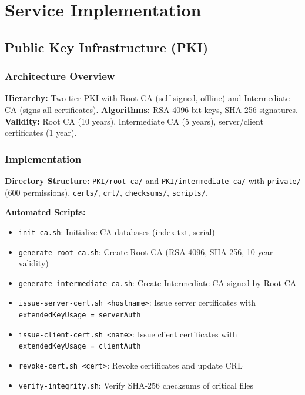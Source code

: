 

\chapter{Service Implementation}

\section{Public Key Infrastructure (PKI)}

\subsection{Architecture Overview}

\textbf{Hierarchy:} Two-tier PKI with Root CA (self-signed, offline) and Intermediate CA (signs all certificates). \textbf{Algorithms:} RSA 4096-bit keys, SHA-256 signatures. \textbf{Validity:} Root CA (10 years), Intermediate CA (5 years), server/client certificates (1 year).

\subsection{Implementation}

\textbf{Directory Structure:} \texttt{PKI/root-ca/} and \texttt{PKI/intermediate-ca/} with \texttt{private/} (600 permissions), \texttt{certs/}, \texttt{crl/}, \texttt{checksums/}, \texttt{scripts/}.

\textbf{Automated Scripts:}
\begin{itemize}
    \item \texttt{init-ca.sh}: Initialize CA databases (index.txt, serial)
    \item \texttt{generate-root-ca.sh}: Create Root CA (RSA 4096, SHA-256, 10-year validity)
    \item \texttt{generate-intermediate-ca.sh}: Create Intermediate CA signed by Root CA
    \item \texttt{issue-server-cert.sh <hostname>}: Issue server certificates with \texttt{extendedKeyUsage = serverAuth}
    \item \texttt{issue-client-cert.sh <name>}: Issue client certificates with \texttt{extendedKeyUsage = clientAuth}
    \item \texttt{revoke-cert.sh <cert>}: Revoke certificates and update CRL
    \item \texttt{verify-integrity.sh}: Verify SHA-256 checksums of critical files
\end{itemize}


